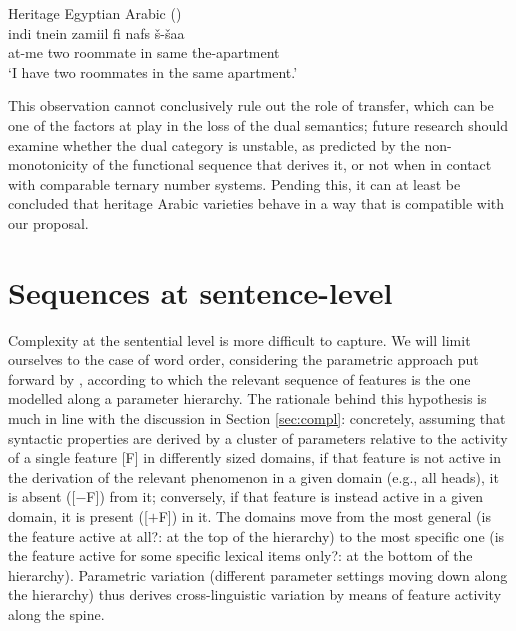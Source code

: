 \documentclass[output=paper]{langscibook}
\begin{document}
\begin{exe}
\ex Heritage Egyptian Arabic (\citealt[741]{Albirini2014})\label{ex:herar1}\\
\gll {\textrevglotstop}indi tnein zamiil fi nafs \v{s}-\v{s}a{\textglotstop\textglotstop}a\\
at-me two roommate in same the-apartment\\
\glt `I have two roommates in the same apartment.'
\end{exe}
This observation cannot conclusively rule out the role of transfer, which can be one of the factors at play in the loss of the dual semantics; future research should examine whether the dual category is unstable, as predicted by the non-monotonicity of the functional sequence that derives it, or not when in contact with comparable ternary number systems. Pending this, it can at least be concluded that heritage Arabic varieties behave in a way that is compatible with our proposal.


\section{Sequences at sentence-level\label{sec:sentence}}

Complexity at the sentential level is more difficult to capture. We will limit ourselves to the case of word order, considering the parametric approach put forward by \citet{Roberts2019}, according to which the relevant sequence of features is the one modelled along a parameter hierarchy. The rationale behind this hypothesis is much in line with the discussion in Section \ref{sec:compl}: concretely, assuming that syntactic properties are derived by a cluster of parameters relative to the activity of a single feature [F] in differently sized domains, if that feature is not active in the derivation of the relevant phenomenon in a given domain (e.g., all heads), it is absent ([$-$F]) from it; conversely, if that feature is instead active in a given domain, it is present ([$+$F]) in it. The domains move from the most general (is the feature active at all?: at the top of the hierarchy) to the most specific one (is the feature active for some specific lexical items only?: at the bottom of the hierarchy). Parametric variation (different parameter settings moving down along the hierarchy) thus derives cross-linguistic variation by means of feature activity along the spine. 
\end{document}
